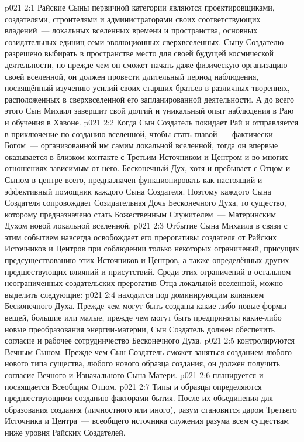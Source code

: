 \vs p021 2:1 Райские Сыны первичной категории являются проектировщиками, создателями, строителями и администраторами своих соответствующих владений~--- локальных вселенных времени и пространства, основных созидательных единиц семи эволюционных сверхвселенных. Сыну Создателю разрешено выбирать в пространстве место для своей будущей космической деятельности, но прежде чем он сможет начать даже физическую организацию своей вселенной, он должен провести длительный период наблюдения, посвящённый изучению усилий своих старших братьев в различных творениях, расположенных в сверхвселенной его запланированной деятельности. А до всего этого Сын Михаил завершит свой долгий и уникальный опыт наблюдения в Раю и обучения в Хавоне.
\vs p021 2:2 \pc Когда Сын Создатель покидает Рай и отправляется в приключение по созданию вселенной, чтобы стать главой~--- фактически Богом~--- организованной им самим локальной вселенной, тогда он впервые оказывается в близком контакте с Третьим Источником и Центром и во многих отношениях зависимым от него. Бесконечный Дух, хотя и пребывает с Отцом и Сыном в центре всего, предназначен функционировать как настоящий и эффективный помощник каждого Сына Создателя. Поэтому каждого Сына Создателя сопровождает Созидательная Дочь Бесконечного Духа, то существо, которому предназначено стать Божественным Служителем~--- Материнским Духом новой локальной вселенной.
\vs p021 2:3 Отбытие Сына Михаила в связи с этим событием навсегда освобождает его прерогативы создателя от Райских Источников и Центров при соблюдении только некоторых ограничений, присущих предсуществованию этих Источников и Центров, а также определённых других предшествующих влияний и присутствий. Среди этих ограничений в остальном неограниченных создательских прерогатив Отца локальной вселенной, можно выделить следующие:
\vs p021 2:4  находится под доминирующим влиянием Бесконечного Духа. Прежде чем могут быть созданы какие\hyp{}либо новые формы вещей, большие или малые, прежде чем могут быть предприняты какие\hyp{}либо новые преобразования энергии\hyp{}материи, Сын Создатель должен обеспечить согласие и рабочее сотрудничество Бесконечного Духа.
\vs p021 2:5  контролируются Вечным Сыном. Прежде чем Сын Создатель сможет заняться созданием любого нового типа существа, любого нового образца создания, он должен получить согласие Вечного и Изначального Сына\hyp{}Матери.
\vs p021 2:6  планируется и посвящается Всеобщим Отцом.
\vs p021 2:7 \pc Типы и образцы  определяются предшествующими созданию факторами бытия. После их объединения для образования создания (личностного или иного), разум становится даром Третьего Источника и Центра~--- всеобщего источника служения разума всем существам ниже уровня Райских Создателей.
